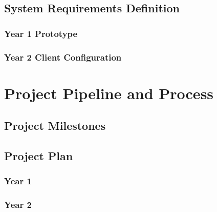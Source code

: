 \subsection{System Requirements Definition}
\subsubsection{Year 1 Prototype}
\subsubsection{Year 2 Client Configuration}

\section{Project Pipeline and Process}
\subsection{Project Milestones}
\subsection{Project Plan}
\subsubsection{Year 1}
\subsubsection{Year 2}